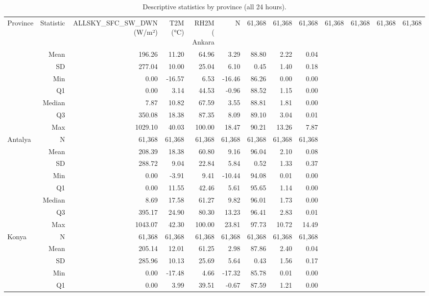 \begin{table}[htbp]
\centering
\caption{Descriptive statistics by province (all 24 hours).}
\label{tab:descriptive_stats_by_city_24h}
\begin{tabular}{lrrrrrrrr}
\hline
Province & Statistic & ALLSKY\_SFC\_SW\_DWN (W/m²) & T2M (°C) & RH2M (%
\hline
Ankara & N & 61,368 & 61,368 & 61,368 & 61,368 & 61,368 & 61,368 & 61,368 \\
 & Mean & 196.26 & 11.20 & 64.96 & 3.29 & 88.80 & 2.22 & 0.04 \\
 & SD & 277.04 & 10.00 & 25.04 & 6.10 & 0.45 & 1.40 & 0.18 \\
 & Min & 0.00 & -16.57 & 6.53 & -16.46 & 86.26 & 0.00 & 0.00 \\
 & Q1 & 0.00 & 3.14 & 44.53 & -0.96 & 88.52 & 1.15 & 0.00 \\
 & Median & 7.87 & 10.82 & 67.59 & 3.55 & 88.81 & 1.81 & 0.00 \\
 & Q3 & 350.08 & 18.38 & 87.35 & 8.09 & 89.10 & 3.04 & 0.01 \\
 & Max & 1029.10 & 40.03 & 100.00 & 18.47 & 90.21 & 13.26 & 7.87 \\
Antalya & N & 61,368 & 61,368 & 61,368 & 61,368 & 61,368 & 61,368 & 61,368 \\
 & Mean & 208.39 & 18.38 & 60.80 & 9.16 & 96.04 & 2.10 & 0.08 \\
 & SD & 288.72 & 9.04 & 22.84 & 5.84 & 0.52 & 1.33 & 0.37 \\
 & Min & 0.00 & -3.91 & 9.41 & -10.44 & 94.08 & 0.01 & 0.00 \\
 & Q1 & 0.00 & 11.55 & 42.46 & 5.61 & 95.65 & 1.14 & 0.00 \\
 & Median & 8.69 & 17.58 & 61.27 & 9.82 & 96.01 & 1.73 & 0.00 \\
 & Q3 & 395.17 & 24.90 & 80.30 & 13.23 & 96.41 & 2.83 & 0.01 \\
 & Max & 1043.07 & 42.30 & 100.00 & 23.81 & 97.73 & 10.72 & 14.49 \\
Konya & N & 61,368 & 61,368 & 61,368 & 61,368 & 61,368 & 61,368 & 61,368 \\
 & Mean & 205.14 & 12.01 & 61.25 & 2.98 & 87.86 & 2.40 & 0.04 \\
 & SD & 285.96 & 10.13 & 25.69 & 5.64 & 0.43 & 1.56 & 0.17 \\
 & Min & 0.00 & -17.48 & 4.66 & -17.32 & 85.78 & 0.01 & 0.00 \\
 & Q1 & 0.00 & 3.99 & 39.51 & -0.67 & 87.59 & 1.21 & 0.00 \\

\end{tabular}
\end{table}
